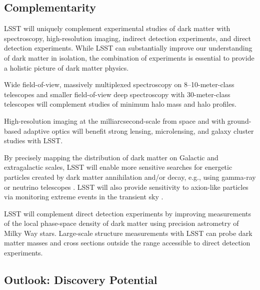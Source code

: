 \documentclass[12pt]{article}
\begin{document}
\subsection*{Complementarity}

LSST will uniquely complement experimental studies of dark matter with spectroscopy, high-resolution imaging, indirect detection experiments, and direct detection experiments.
While LSST can substantially improve our understanding of dark matter in isolation, the combination of experiments is essential to provide a holistic picture of dark matter physics.

Wide field-of-view, massively multiplexed spectroscopy on 8--10-meter-class telescopes and smaller field-of-view deep spectroscopy with 30-meter-class telescopes will complement studies of minimum halo mass and halo profiles.

 High-resolution imaging at the milliarcsecond-scale from space and with ground-based adaptive optics will benefit strong lensing, microlensing, and galaxy cluster studies with LSST.

 By precisely mapping the distribution of dark matter on Galactic and extragalactic scales, LSST will enable more sensitive searches for energetic particles created by dark matter annihilation and/or decay, e.g., using gamma-ray or neutrino telescopes \citep{Charles:2016,Albert:2017,1404.5503}.
LSST will also provide sensitivity to axion-like particles via monitoring extreme events in the transient sky \citep{2017PhRvL.118a1103M}.



 LSST will complement direct detection experiments by improving measurements of the local phase-space density of dark matter using precision astrometry of Milky Way stars.
Large-scale structure measurements with LSST can probe dark matter masses and cross sections outside the range accessible to direct detection experiments.

\subsection*{Outlook: Discovery Potential}
\end{document}

